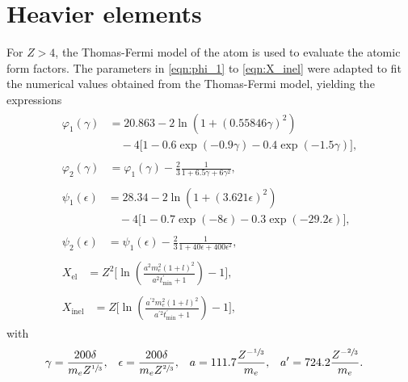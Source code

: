 \section{Heavier elements}

For $Z>4$, the Thomas-Fermi model of the atom is used to evaluate the atomic form factors.
The parameters in \eqref{eqn:phi_1} to \eqref{eqn:X_inel} were adapted to fit the numerical values obtained from the Thomas-Fermi model, yielding the expressions \cite{RevModPhys.46.815}
%
\begingroup
\allowdisplaybreaks
\begin{align}
	\begin{split}
		\varphi_1(\gamma) &= 20.863 - 2 \ln(1 + (0.55846 \gamma)^2) \\&\quad- 4 \biggl[ 1 - 0.6 \exp(-0.9\gamma) - 0.4 \exp(-1.5 \gamma) \biggr],
	\end{split}
	\\[2ex]
	\begin{split}
		\varphi_2(\gamma) &= \varphi_1(\gamma) - \frac{2}{3} \frac{1}{1 + 6.5\gamma + 6\gamma^2},
	\end{split}
	\\[2ex]
	\begin{split}
		\psi_1(\epsilon) &=  28.34 - 2\ln(1 + (3.621 \epsilon)^2) \\&\quad- 4 \biggl[ 1 - 0.7 \exp(- 8 \epsilon) - 0.3 \exp(-29.2\epsilon) \biggr],
	\end{split}
	\\[2ex]
	\begin{split}
		\psi_2(\epsilon) &= \psi_1(\epsilon) - \frac{2}{3} \frac{1}{1 + 40\epsilon + 400\epsilon^2},
	\end{split}
	\\[2ex]
	\begin{split}
		X_{\text{el}} &= Z^2 \biggl[ \ln\left( \frac{a^2 m_e^2 (1 + l)^2}{a^2 t_{\text{min}}^{\prime} + 1}\right) - 1 \biggr],
	\end{split}
	\\[2ex]
	\begin{split}
		X_{\text{inel}} &= Z \biggl[ \ln\left( \frac{a^{\prime2} m_e^2 (1 + l)^2 }{a^{\prime2} t_{\text{min}}^{\prime} + 1 } \right) - 1\biggr],
	\end{split}
\end{align}
\endgroup
%
with
%
\begin{align*}
	\gamma &= \frac{200 \delta}{m_e Z^{\sfrac{1}{3}}}, & \epsilon &= \frac{200 \delta}{m_e Z^{\sfrac{2}{3}}}, & a &= 111.7 \frac{Z^{-\sfrac{1}{3}}}{m_e}, & a^{\prime} &= 724.2 \frac{Z^{-\sfrac{2}{3}}}{m_e}.
\end{align*}
%

